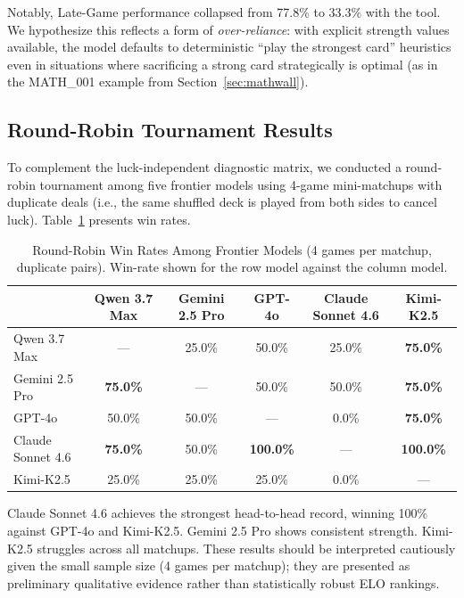 \documentclass[11pt]{article}
\begin{document}
Notably, Late-Game performance collapsed from 77.8\% to 33.3\% with the tool. We hypothesize this reflects a form of \textit{over-reliance}: with explicit strength values available, the model defaults to deterministic ``play the strongest card'' heuristics even in situations where sacrificing a strong card strategically is optimal (as in the MATH\_001 example from Section~\ref{sec:mathwall}).

\subsection{Round-Robin Tournament Results}

To complement the luck-independent diagnostic matrix, we conducted a round-robin tournament among five frontier models using 4-game mini-matchups with duplicate deals (i.e., the same shuffled deck is played from both sides to cancel luck). Table~\ref{tab:tournament} presents win rates.

\begin{table}[htbp]
\centering
\caption{Round-Robin Win Rates Among Frontier Models (4 games per matchup, duplicate pairs). Win-rate shown for the row model against the column model.}
\label{tab:tournament}
\begin{tabular}{@{}lccccc@{}}
\toprule
 & Qwen 3.7 Max & Gemini 2.5 Pro & GPT-4o & Claude Sonnet 4.6 & Kimi-K2.5 \\
\midrule
Qwen 3.7 Max      & ---  & 25.0\% & 50.0\% & 25.0\%  & \textbf{75.0\%} \\
Gemini 2.5 Pro    & \textbf{75.0\%} & ---  & 50.0\% & 50.0\%  & \textbf{75.0\%} \\
GPT-4o            & 50.0\% & 50.0\% & ---  & 0.0\%   & \textbf{75.0\%} \\
Claude Sonnet 4.6 & \textbf{75.0\%} & 50.0\% & \textbf{100.0\%} & ---   & \textbf{100.0\%} \\
Kimi-K2.5         & 25.0\% & 25.0\% & 25.0\% & 0.0\%   & --- \\
\bottomrule
\end{tabular}
\end{table}

Claude Sonnet 4.6 achieves the strongest head-to-head record, winning 100\% against GPT-4o and Kimi-K2.5. Gemini 2.5 Pro shows consistent strength. Kimi-K2.5 struggles across all matchups. These results should be interpreted cautiously given the small sample size (4 games per matchup); they are presented as preliminary qualitative evidence rather than statistically robust ELO rankings.
\end{document}
